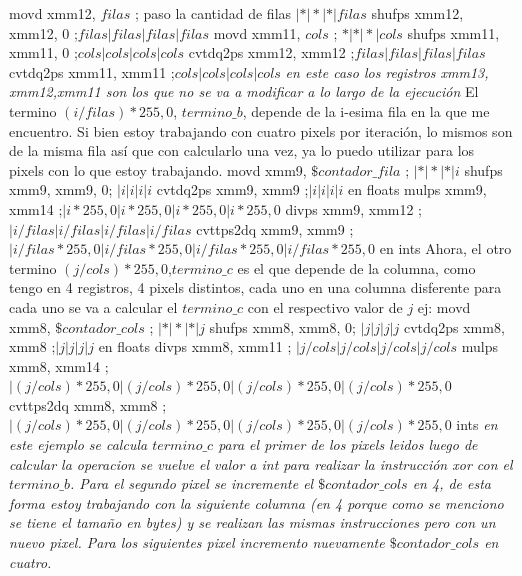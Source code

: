 \documentclass[a4paper]{article}
\begin{document}
movd xmm12, $filas$ ; paso la cantidad de filas $|*|*|*|filas$\newline
shufps xmm12, xmm12, 0 ;$filas|filas|filas|filas$\newline
movd xmm11, $cols$ ; $*|*|*|cols$\newline
shufps xmm11, xmm11, 0 ;$cols|cols|cols|cols$\newline
cvtdq2ps xmm12, xmm12 ;$filas|filas|filas|filas$\newline
cvtdq2ps xmm11, xmm11 ;$cols|cols|cols|cols$\newline
\textit{en este caso los registros xmm13, xmm12,xmm11 son los que no se va a modificar a lo largo de la ejecución }\newline
El termino $(i/filas)*255,0$, $termino\_b$, depende de la i-esima fila en la que me encuentro. Si bien estoy trabajando con cuatro pixels por iteración, lo mismos son de la misma fila así que con calcularlo una vez, ya lo puedo utilizar para los pixels con lo que estoy trabajando. 
movd xmm9, $\$contador\_fila$ ; $|*|*|*|i$\newline
shufps xmm9, xmm9, 0; $|i|i|i|i$\newline
cvtdq2ps xmm9, xmm9 ;$|i|i|i|i$ en floats\newline
mulps xmm9, xmm14 ;$|i*255,0|i*255,0|i*255,0|i*255,0$\newline
divps xmm9, xmm12 ; $|i/filas|i/filas|i/filas|i/filas$\newline
cvttps2dq xmm9, xmm9 ;$|i/filas*255,0|i/filas*255,0|i/filas*255,0| i/filas*255,0$ en ints\newline
Ahora, el otro termino  $(j/cols)*255,0$,$termino\_c$ es el  que depende de la columna, como tengo en 4 registros, 4 pixels distintos, cada uno en una columna disferente para cada uno se va a calcular el $termino\_c$ con el respectivo valor de $j$ ej:\newline
movd xmm8, $\$contador\_cols$ ; $|*|*|*|j$\newline
shufps xmm8, xmm8, 0; $|j|j|j|j$\newline
cvtdq2ps xmm8, xmm8 ;$|j|j|j|j$ en floats\newline
divps xmm8, xmm11 ; $|j/cols|j/cols|j/cols|j/cols$\newline
mulps xmm8, xmm14 ; $|(j/cols)*255,0|(j/cols)*255,0|(j/cols)*255,0|(j/cols)*255,0$\newline
cvttps2dq xmm8, xmm8 ;$|(j/cols)*255,0|(j/cols)*255,0|(j/cols)*255,0|(j/cols)*255,0$ ints\newline
\textit{en este ejemplo se calcula $termino\_c$ para el primer de los pixels leidos luego de calcular la operacion se vuelve el valor a int para realizar la instrucción xor con el $termino\_b$. Para el segundo pixel se incremente el $\$contador\_cols$ en 4, de esta forma estoy trabajando con la siguiente columna (en 4 porque como se menciono se tiene el tamaño en bytes) y se realizan las mismas instrucciones pero con un nuevo pixel. Para los siguientes pixel incremento nuevamente $\$contador\_cols$ en cuatro.} \newline 
\end{document}
